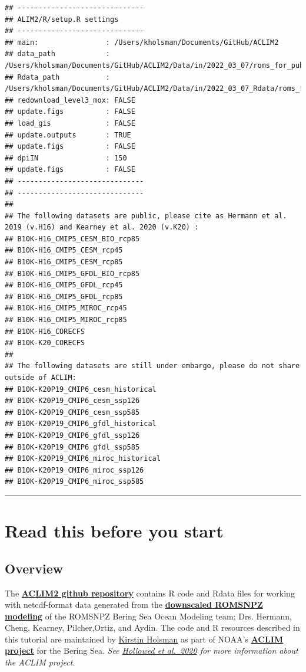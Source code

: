 \documentclass[
]{article}
\begin{document}
\begin{verbatim}
## ------------------------------
## ALIM2/R/setup.R settings 
## ------------------------------
## main:                : /Users/kholsman/Documents/GitHub/ACLIM2 
## data_path            : /Users/kholsman/Documents/GitHub/ACLIM2/Data/in/2022_03_07/roms_for_public 
## Rdata_path           : /Users/kholsman/Documents/GitHub/ACLIM2/Data/in/2022_03_07_Rdata/roms_for_public 
## redownload_level3_mox: FALSE 
## update.figs          : FALSE 
## load_gis             : FALSE 
## update.outputs       : TRUE 
## update.figs          : FALSE 
## dpiIN                : 150 
## update.figs          : FALSE 
## ------------------------------
## ------------------------------
## 
## The following datasets are public, please cite as Hermann et al. 2019 (v.H16) and Kearney et al. 2020 (v.K20) :
## B10K-H16_CMIP5_CESM_BIO_rcp85 
## B10K-H16_CMIP5_CESM_rcp45 
## B10K-H16_CMIP5_CESM_rcp85 
## B10K-H16_CMIP5_GFDL_BIO_rcp85 
## B10K-H16_CMIP5_GFDL_rcp45 
## B10K-H16_CMIP5_GFDL_rcp85 
## B10K-H16_CMIP5_MIROC_rcp45 
## B10K-H16_CMIP5_MIROC_rcp85 
## B10K-H16_CORECFS 
## B10K-K20_CORECFS 
## 
## The following datasets are still under embargo, please do not share outside of ACLIM:
## B10K-K20P19_CMIP6_cesm_historical 
## B10K-K20P19_CMIP6_cesm_ssp126 
## B10K-K20P19_CMIP6_cesm_ssp585 
## B10K-K20P19_CMIP6_gfdl_historical 
## B10K-K20P19_CMIP6_gfdl_ssp126 
## B10K-K20P19_CMIP6_gfdl_ssp585 
## B10K-K20P19_CMIP6_miroc_historical 
## B10K-K20P19_CMIP6_miroc_ssp126 
## B10K-K20P19_CMIP6_miroc_ssp585
\end{verbatim}

\begin{center}\rule{0.5\linewidth}{0.5pt}\end{center}

\hypertarget{read-this-before-you-start}{%
\section{Read this before you start}\label{read-this-before-you-start}}

\hypertarget{overview}{%
\subsection{Overview}\label{overview}}

The \href{https://github.com/kholsman/ACLIM2}{\textbf{ACLIM2 github
repository}} contains R code and Rdata files for working with
netcdf-format data generated from the
\href{https://beringnpz.github.io/roms-bering-sea}{\textbf{downscaled
ROMSNPZ modeling}} of the ROMSNPZ Bering Sea Ocean Modeling team; Drs.
Hermann, Cheng, Kearney, Pilcher,Ortiz, and Aydin. The code and R
resources described in this tutorial are maintained by
\href{mailto:kirstin.holsman@noaa.gov}{Kirstin Holsman} as part of
NOAA's
\href{https://www.fisheries.noaa.gov/alaska/ecosystems/alaska-climate-integrated-modeling-project}{\textbf{ACLIM
project}} for the Bering Sea. \emph{See
\href{https://www.frontiersin.org/articles/10.3389/fmars.2019.00775/full}{Hollowed
et al.~2020} for more information about the ACLIM project.}
\end{document}
